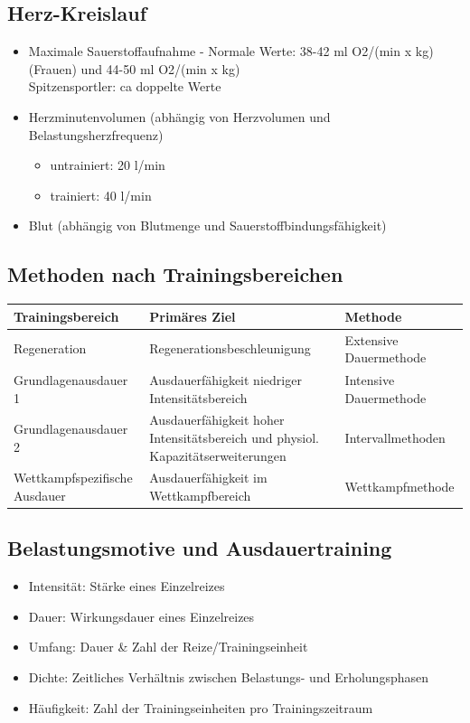 \subsection{Herz-Kreislauf}
\begin{itemize}
  \item Maximale Sauerstoffaufnahme - Normale Werte: 38-42 ml O2/(min x kg) (Frauen) und 44-50 ml O2/(min x kg) \\
    Spitzensportler: ca doppelte Werte
  \item Herzminutenvolumen (abhängig von Herzvolumen und Belastungsherzfrequenz)
    \begin{itemize}
      \item untrainiert: 20 l/min
      \item trainiert: 40 l/min
    \end{itemize}
  \item Blut (abhängig von Blutmenge und Sauerstoffbindungsfähigkeit)
\end{itemize}

\subsection{Methoden nach Trainingsbereichen}
\begin{centering}
\begin{tabular}{m{} | m{} | m{}}
   Trainingsbereich              & Primäres Ziel                                                                   & Methode \\ \hline
   Regeneration                  & Regenerationsbeschleunigung                                                     & Extensive Dauermethode \\ \hline
   Grundlagenausdauer 1          & Ausdauerfähigkeit niedriger Intensitätsbereich                                  & Intensive Dauermethode \\ \hline
   Grundlagenausdauer 2          & Ausdauerfähigkeit hoher Intensitätsbereich und physiol. Kapazitätserweiterungen & Intervallmethoden \\ \hline
   Wettkampfspezifische Ausdauer & Ausdauerfähigkeit im Wettkampfbereich                                           & Wettkampfmethode \\     
\end{tabular}
\end{centering}

\subsection{Belastungsmotive und Ausdauertraining}
\begin{itemize}
  \item Intensität: Stärke eines Einzelreizes
  \item Dauer: Wirkungsdauer eines Einzelreizes
  \item Umfang: Dauer \& Zahl der Reize/Trainingseinheit
  \item Dichte: Zeitliches Verhältnis zwischen Belastungs- und Erholungsphasen
  \item Häufigkeit: Zahl der Trainingseinheiten pro Trainingszeitraum
\end{itemize}

